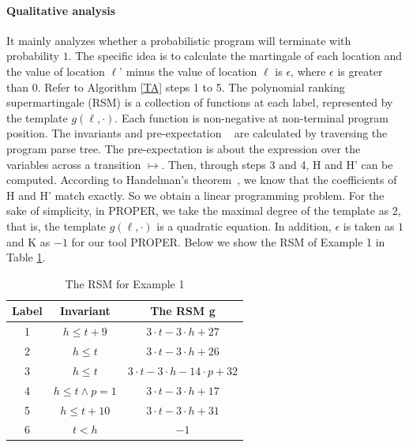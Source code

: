 \documentclass[sigconf,review, anonymous]{acmart}
\begin{document}
\paragraph{Qualitative analysis} It mainly analyzes whether a probabilistic program will terminate with probability $1$. The specific idea is to calculate the martingale of each location and the value of location $\ell$' minus the value of location $\ell$ is $\epsilon$, where $\epsilon$ is greater than $0$. Refer to Algorithm \ref{TA} steps 1 to 5. The polynomial ranking supermartingale (RSM) is a collection of functions at each label, represented by the template $g(\ell,\cdot)$. Each function is non-negative at non-terminal program position. The invariants and pre-expectation ~\cite{Chakarov2013Martingales} are calculated by traversing the program parse tree. The pre-expectation is about the expression over the variables across a transition $\mapsto$. Then, through steps 3 and 4, H and H' can be computed. According to Handelman's theorem~\cite{Handelman1988Representing}, we know that the coefficients of H and H' match exactly. So we obtain a linear programming problem.  For the sake of simplicity, in PROPER, we take the maximal degree of the template as $2$, that is, the template $g(\ell,\cdot)$ is a quadratic equation. In addition, $\epsilon$ is taken as $1$ and K as $-1$ for our tool PROPER. Below we show the RSM of Example 1 in Table \ref{RSM}. 

\begin{table}[htb]
	\centering
	\caption{The RSM for Example 1}
	\label{RSM}
	\begin{tabular}{|c|c|c|}
		\hline
		Label& Invariant & The RSM g \\ \hline
		1 & $h\leq t+9$ &$3\cdot t-3\cdot h+27$ \\ \hline
		2 & $h\leq t$ &$3\cdot t-3\cdot h+26$ \\ \hline
		3 & $h\leq t$  &$3\cdot t-3\cdot h-14\cdot p+32$ \\ \hline
		4 & $h\leq t\land p=1$ &$3\cdot t-3\cdot h+17$ \\ \hline
		5 & $h\leq t+10$&$3\cdot t-3\cdot h+31$ \\ \hline
		6 & $t<h$ &$-1$ \\ \hline
	\end{tabular}
\end{table}
\end{document}
